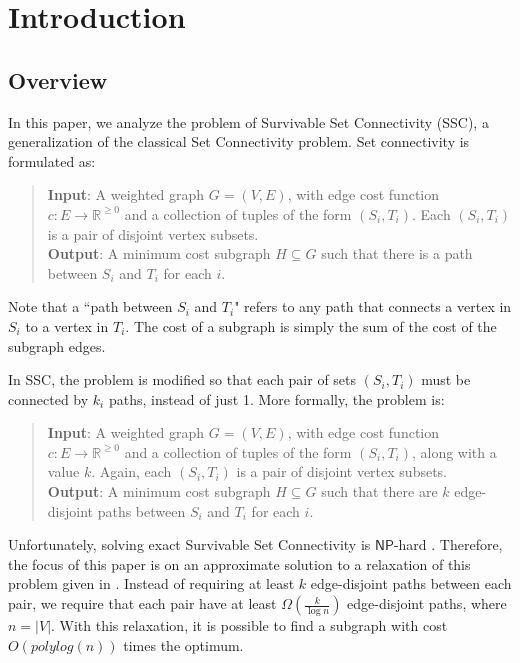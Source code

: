 \documentclass[12pt]{article}
\begin{document}
\maketitle

\section{Introduction}

\subsection{Overview}

In this paper, we analyze the problem of Survivable Set Connectivity (SSC), a generalization of the classical Set Connectivity problem. Set connectivity is formulated as:
\begin{quote}
\textbf{Input}: A weighted graph $G = (V, E)$, with edge cost function $c: E \rightarrow \mathbb{R}^{\geq 0}$ and a collection of tuples of the form $(S_i, T_i)$. Each $(S_i,T_i)$ is a pair of disjoint vertex subsets. \\
\textbf{Output}: A minimum cost subgraph $H \subseteq G$ such that there is a path between $S_i$ and $T_i$ for each $i$. 
\end{quote}

Note that a ``path between $S_i$ and $T_i$" refers to any path that connects a vertex in $S_i$ to a vertex in $T_i$. The cost of a subgraph is simply the sum of the cost of the subgraph edges.

In SSC, the problem is modified so that each pair of sets $(S_i,T_i)$ must be connected by $k_i$ paths, instead of just 1. More formally, the problem is:

\begin{quote}
\textbf{Input}: A weighted graph $G = (V, E)$, with edge cost function $c: E \rightarrow \mathbb{R}^{\geq 0}$ and a collection of tuples of the form $(S_i, T_i)$, along with a value $k$. Again, each $(S_i,T_i)$ is a pair of disjoint vertex subsets. \\
\textbf{Output}: A minimum cost subgraph $H \subseteq G$ such that there are $k$ edge-disjoint paths between $S_i$ and $T_i$ for each $i$. 
\end{quote}

Unfortunately, solving exact Survivable Set Connectivity is $\mathsf{NP}$-hard \cite{ssc}. Therefore, the focus of this paper is on an approximate solution to a relaxation of this problem given in \cite{ssc}. Instead of requiring at least $k$ edge-disjoint paths between each pair, we require that each pair have at least $\Omega(\frac{k}{\log n})$ edge-disjoint paths, where $n = |V|$. With this relaxation, it is possible to find a subgraph with cost $O(polylog(n))$ times the optimum.
\end{document}

